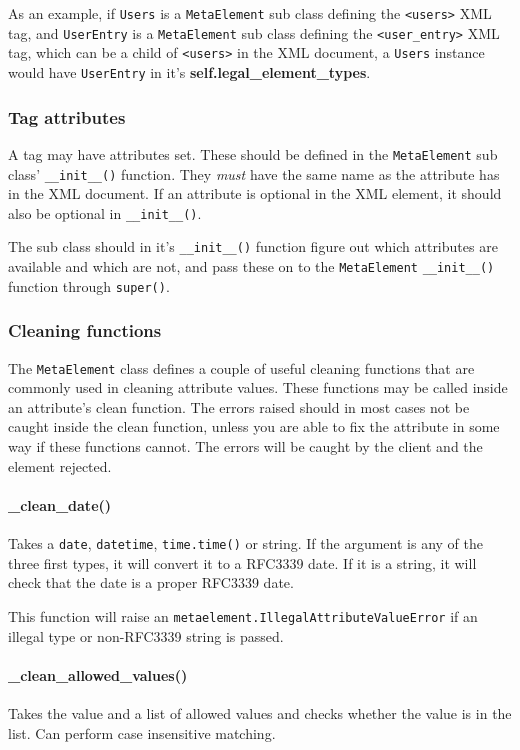 As an example, if \texttt{Users} is a \texttt{MetaElement} sub class defining
the \texttt{<users>} XML tag, and \texttt{UserEntry} is a \texttt{MetaElement}
sub class defining the \texttt{<user\_entry>} XML tag, which can be a child of
\texttt{<users>} in the XML document, a \texttt{Users} instance would have
\texttt{UserEntry} in it's \textbf{self.legal\_element\_types}.

\subsubsection{Tag attributes}
A tag may have attributes set. These should be defined in the
\texttt{MetaElement} sub class' \texttt{\_\_init\_\_()} function. They
\textit{must} have the same name as the attribute has in the XML document. If
an attribute is optional in the XML element, it should also be optional in
\texttt{\_\_init\_\_()}. 

The sub class should in it's \texttt{\_\_init\_\_()} function figure out which
attributes are available and which are not, and pass these on to the
\texttt{MetaElement} \texttt{\_\_init\_\_()} function through \texttt{super()}. 

\subsubsection{Cleaning functions}
\label{sec:metaelement_cleaning_functions}
The \texttt{MetaElement} class defines a couple of useful cleaning functions
that are commonly used in cleaning attribute values. These functions may be
called inside an attribute's clean function. The errors raised should in most
cases not be caught inside the clean function, unless you are able to fix the
attribute in some way if these functions cannot. The errors will be caught by
the client and the element rejected. 

\paragraph{\_clean\_date()} Takes a \texttt{date}, \texttt{datetime},
\texttt{time.time()} or string. If the argument is any of the three first
types, it will convert it to a RFC3339 date. If it is a string, it will check
that the date is a proper RFC3339 date. 

This function will raise an \texttt{metaelement.IllegalAttributeValueError} if
an illegal type or non-RFC3339 string is passed.

\paragraph{\_clean\_allowed\_values()} Takes the value and a list of allowed
values and checks whether the value is in the list. Can perform case
insensitive matching.

